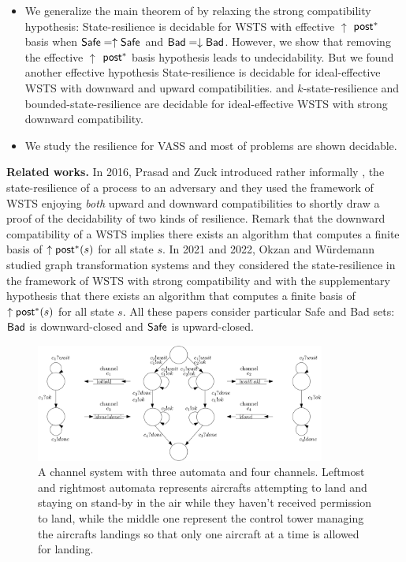 \begin{itemize}
\item We generalize the main theorem of \cite{} by relaxing the strong compatibility hypothesis: {\sc State-resilience} is decidable for 
 WSTS with effective 
$\uparrow$ $\textsf{post}^*$ basis
when
$\textsf{Safe}=\uparrow \textsf{Safe}$
and $\textsf{Bad}=\downarrow \textsf{Bad}$. However, we show that removing the effective 
$\uparrow$ $\textsf{post}^*$ basis hypothesis leads to undecidability. But we found another effective hypothesis {\sc State-resilience} is decidable for ideal-effective WSTS with downward and upward compatibilities. and {\sc $k$-state-resilience} and {\sc bounded-state-resilience} are decidable for ideal-effective WSTS with strong downward compatibility.

\item We study the resilience for VASS and most of problems are shown decidable.
\end{itemize}


{\bf Related works.} 
In 2016, Prasad and Zuck introduced rather informally \cite{DBLP:journals/corr/PrasadZ16}, the state-resilience of a process to an adversary and they used the framework of WSTS enjoying \emph{both} upward and downward compatibilities to shortly draw a proof of the decidability of two kinds of resilience. Remark that the downward compatibility of a WSTS implies  there exists an algorithm that computes a finite basis of $\uparrow \textsf{post}^*(s)$ for all state $s$. In 2021 and 2022, Okzan and Würdemann \cite{DBLP:journals/corr/abs-2108-00889,DBLP:conf/gg/Ozkan22} studied graph transformation systems and they considered the state-resilience in the framework of WSTS with strong compatibility and with the supplementary hypothesis that there exists an algorithm that computes a finite basis of $\uparrow \textsf{post}^*(s)$ for all state $s$. All these papers consider particular Safe and Bad sets: $\textsf{Bad}$ is downward-closed and $\textsf{Safe}$ is upward-closed.
 



\begin{center}
	\begin{figure}
			\hspace{0.75cm}
\includegraphics[width=0.85\textwidth]{FigureB}
	\caption{A channel system with three automata and four channels. Leftmost and rightmost automata represents aircrafts attempting to land and staying on stand-by in the air while they haven't received permission to land, while the middle one represent the control tower managing the aircrafts landings so that only one aircraft at a time is allowed for landing.}
					\label{air control}
	\end{figure}
\end{center}

